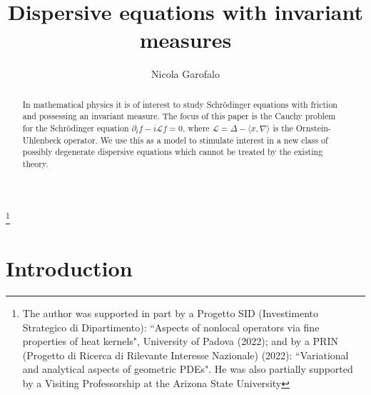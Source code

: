\documentclass[11pt,a4paper]{amsart}
\newcommand{\p}{\partial}
\numberwithin{equation}{section}
\newcommand{\sa}{\langle}
\newcommand{\da}{\rangle}
\numberwithin{equation}{section}
\begin{document}
\title[Dispersive equations with invariant measures]{Dispersive equations with invariant measures}







\date{}

\begin{abstract}
In mathematical physics it is of interest to study Schr\"odinger equations with friction and possessing an invariant measure. The focus of this paper is the Cauchy problem for the Schr\"odinger equation $\p_t f - i \mathscr L f = 0$, where  $\mathscr L = \Delta - \sa x,\nabla\da$ is the Ornstein-Uhlenbeck operator. We use this as a model to stimulate interest in a new class of possibly degenerate dispersive equations which cannot be treated by the existing theory.   
\end{abstract}


\author{Nicola Garofalo}

\address{School of Mathematical and Statistical Sciences\\ Arizona State University\\ Tempe, AZ 85287-1804}
\vskip 0.2in

\thanks{The author was supported in part by a Progetto SID (Investimento Strategico di Dipartimento): ``Aspects of nonlocal operators via fine properties of heat kernels", University of Padova (2022); and by a PRIN (Progetto di Ricerca di Rilevante Interesse Nazionale) (2022): ``Variational and analytical aspects of geometric PDEs". He was also partially supported by a Visiting Professorship at the Arizona State University}


\maketitle






\section{Introduction}\label{S:intro}
\end{document}
